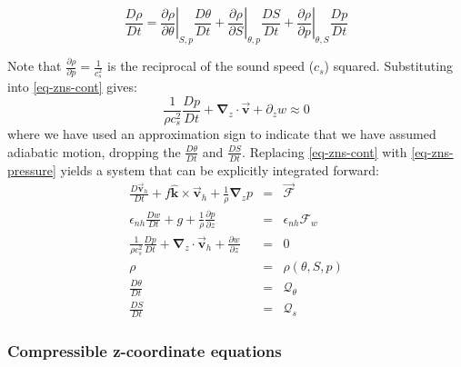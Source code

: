 \begin{equation}
\frac{D\rho }{Dt}=\left. \frac{\partial \rho }{\partial \theta }\right|
_{S,p}\frac{D\theta }{Dt}+\left. \frac{\partial \rho }{\partial S}\right|
_{\theta ,p}\frac{DS}{Dt}+\left. \frac{\partial \rho }{\partial p}\right|
_{\theta ,S}\frac{Dp}{Dt}  \label{EOSexpansion}
\end{equation}

Note that $\frac{\partial \rho }{\partial p}=\frac{1}{c_{s}^{2}}$ is the
reciprocal of the sound speed ($c_{s}$) squared. Substituting into \ref{eq-zns-cont} gives: 
\begin{equation}
\frac{1}{\rho c_{s}^{2}}\frac{Dp}{Dt}+\mathbf{\nabla }_{z}\cdot \vec{\mathbf{
v}}+\partial _{z}w\approx 0  \label{eq-zns-pressure}
\end{equation}
where we have used an approximation sign to indicate that we have assumed
adiabatic motion, dropping the $\frac{D\theta }{Dt}$ and $\frac{DS}{Dt}$.
Replacing \ref{eq-zns-cont} with \ref{eq-zns-pressure} yields a system that
can be explicitly integrated forward: 
\begin{eqnarray}
\frac{D\vec{\mathbf{v}}_{h}}{Dt}+f\hat{\mathbf{k}}\times \vec{\mathbf{v}}
_{h}+\frac{1}{\rho }\mathbf{\nabla }_{z}p &=&\vec{\mathbf{\mathcal{F}}}
\label{eq-cns-hmom} \\
\epsilon _{nh}\frac{Dw}{Dt}+g+\frac{1}{\rho }\frac{\partial p}{\partial z}
&=&\epsilon _{nh}\mathcal{F}_{w}  \label{eq-cns-hydro} \\
\frac{1}{\rho c_{s}^{2}}\frac{Dp}{Dt}+\mathbf{\nabla }_{z}\cdot \vec{\mathbf{
v}}_{h}+\frac{\partial w}{\partial z} &=&0  \label{eq-cns-cont} \\
\rho &=&\rho (\theta ,S,p)  \label{eq-cns-eos} \\
\frac{D\theta }{Dt} &=&\mathcal{Q}_{\theta }  \label{eq-cns-heat} \\
\frac{DS}{Dt} &=&\mathcal{Q}_{s}  \label{eq-cns-salt}
\end{eqnarray}

\subsubsection{Compressible z-coordinate equations}

